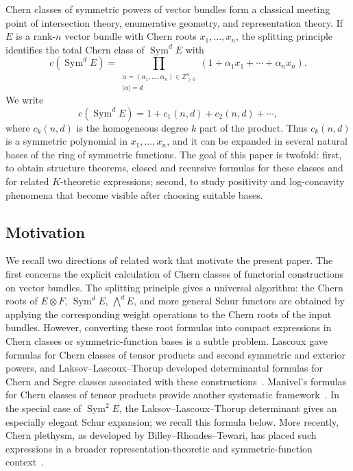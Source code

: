 \documentclass[11pt]{amsart}
\numberwithin{equation}{section}
\theoremstyle{remark}
\DeclareMathOperator{\Sym}{Sym}
\newcommand{\Z}{\mathbb Z}
\begin{document}
Chern classes of symmetric powers of vector bundles form a classical meeting point of intersection theory, enumerative geometry, and representation theory.  If $E$ is a rank-$n$ vector bundle with Chern roots $x_1,\ldots,x_n$, the splitting principle identifies the total Chern class of $\Sym^dE$ with
\begin{equation}\label{eq:intro-total}
  c(\Sym^dE)=
  \prod_{\substack{\alpha=(\alpha_1,\ldots,\alpha_n)\in\Z_{\ge0}^n\\|\alpha|=d}}
  \left(1+\alpha_1x_1+\cdots+\alpha_nx_n\right).
\end{equation}
We write
\[
  c(\Sym^dE)=1+c_1(n,d)+c_2(n,d)+\cdots,
\]
where $c_k(n,d)$ is the homogeneous degree $k$ part of the product.  Thus $c_k(n,d)$ is a symmetric polynomial in $x_1,\ldots,x_n$, and it can be expanded in several natural bases of the ring of symmetric functions.  The goal of this paper is twofold: first, to obtain structure theorems,  closed and recursive formulas for these classes and for related $K$-theoretic expressions; second, to study positivity and log-concavity phenomena that become visible after choosing suitable bases.

\subsection{Motivation} 
We recall two directions of related work that motivate the present paper.  The first concerns the explicit calculation of Chern classes of functorial constructions on vector bundles.  The splitting principle gives a universal algorithm: the Chern roots of $E\otimes F$, $\Sym^dE$, $\bigwedge^dE$, and more general Schur functors are obtained by applying the corresponding weight operations to the Chern roots of the input bundles.  However, converting these root formulas into compact expressions in Chern classes or symmetric-function bases is a subtle problem.  Lascoux gave formulas for Chern classes of tensor products and second symmetric and exterior powers, and Laksov--Lascoux--Thorup developed determinantal formulas for Chern and Segre classes associated with these constructions~\cite{LascouxTensor,LLT}.  Manivel's formulas for Chern classes of tensor products provide another systematic framework~\cite{ManivelChern}.  In the special case of $\Sym^2E$, the Laksov--Lascoux--Thorup determinant gives an especially elegant Schur expansion; we recall this formula below.  More recently, Chern plethysm, as developed by Billey--Rhoades--Tewari, has placed such expressions in a broader representation-theoretic and symmetric-function context~\cite{BRT}.
\end{document}
